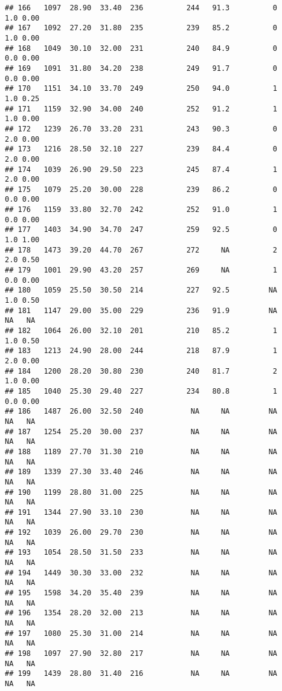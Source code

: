 \documentclass[
]{article}
\begin{document}
\begin{verbatim}
## 166   1097  28.90  33.40  236          244   91.3          0     1.0 0.00
## 167   1092  27.20  31.80  235          239   85.2          0     1.0 0.00
## 168   1049  30.10  32.00  231          240   84.9          0     0.0 0.00
## 169   1091  31.80  34.20  238          249   91.7          0     0.0 0.00
## 170   1151  34.10  33.70  249          250   94.0          1     1.0 0.25
## 171   1159  32.90  34.00  240          252   91.2          1     1.0 0.00
## 172   1239  26.70  33.20  231          243   90.3          0     2.0 0.00
## 173   1216  28.50  32.10  227          239   84.4          0     2.0 0.00
## 174   1039  26.90  29.50  223          245   87.4          1     2.0 0.00
## 175   1079  25.20  30.00  228          239   86.2          0     0.0 0.00
## 176   1159  33.80  32.70  242          252   91.0          1     0.0 0.00
## 177   1403  34.90  34.70  247          259   92.5          0     1.0 1.00
## 178   1473  39.20  44.70  267          272     NA          2     2.0 0.50
## 179   1001  29.90  43.20  257          269     NA          1     0.0 0.00
## 180   1059  25.50  30.50  214          227   92.5         NA     1.0 0.50
## 181   1147  29.00  35.00  229          236   91.9         NA      NA   NA
## 182   1064  26.00  32.10  201          210   85.2          1     1.0 0.50
## 183   1213  24.90  28.00  244          218   87.9          1     2.0 0.00
## 184   1200  28.20  30.80  230          240   81.7          2     1.0 0.00
## 185   1040  25.30  29.40  227          234   80.8          1     0.0 0.00
## 186   1487  26.00  32.50  240           NA     NA         NA      NA   NA
## 187   1254  25.20  30.00  237           NA     NA         NA      NA   NA
## 188   1189  27.70  31.30  210           NA     NA         NA      NA   NA
## 189   1339  27.30  33.40  246           NA     NA         NA      NA   NA
## 190   1199  28.80  31.00  225           NA     NA         NA      NA   NA
## 191   1344  27.90  33.10  230           NA     NA         NA      NA   NA
## 192   1039  26.00  29.70  230           NA     NA         NA      NA   NA
## 193   1054  28.50  31.50  233           NA     NA         NA      NA   NA
## 194   1449  30.30  33.00  232           NA     NA         NA      NA   NA
## 195   1598  34.20  35.40  239           NA     NA         NA      NA   NA
## 196   1354  28.20  32.00  213           NA     NA         NA      NA   NA
## 197   1080  25.30  31.00  214           NA     NA         NA      NA   NA
## 198   1097  27.90  32.80  217           NA     NA         NA      NA   NA
## 199   1439  28.80  31.40  216           NA     NA         NA      NA   NA

\end{verbatim}
\end{document}
